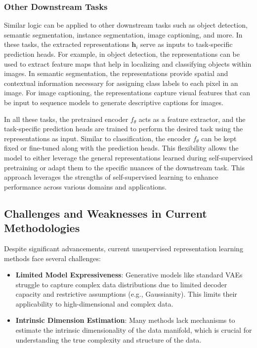 \begin{itemize}
\subsubsection{Other Downstream Tasks}

Similar logic can be applied to other downstream tasks such as object detection, semantic segmentation, instance segmentation, image captioning, and more. In these tasks, the extracted representations \( \mathbf{h}_i \) serve as inputs to task-specific prediction heads. For example, in object detection, the representations can be used to extract feature maps that help in localizing and classifying objects within images. In semantic segmentation, the representations provide spatial and contextual information necessary for assigning class labels to each pixel in an image. For image captioning, the representations capture visual features that can be input to sequence models to generate descriptive captions for images.

In all these tasks, the pretrained encoder \( f_{\theta} \) acts as a feature extractor, and the task-specific prediction heads are trained to perform the desired task using the representations as input. Similar to classification, the encoder \( f_{\theta} \) can be kept fixed or fine-tuned along with the prediction heads. This flexibility allows the model to either leverage the general representations learned during self-supervised pretraining or adapt them to the specific nuances of the downstream task. This approach leverages the strengths of self-supervised learning to enhance performance across various domains and applications.


\subsection{Challenges and Weaknesses in Current Methodologies}

Despite significant advancements, current unsupervised representation learning methods face several challenges:

\begin{itemize}
    \item \textbf{Limited Model Expressiveness}: Generative models like standard VAEs struggle to capture complex data distributions due to limited decoder capacity and restrictive assumptions (e.g., Gaussianity). This limits their applicability to high-dimensional and complex data.

    \item \textbf{Intrinsic Dimension Estimation}: Many methods lack mechanisms to estimate the intrinsic dimensionality of the data manifold, which is crucial for understanding the true complexity and structure of the data.


\end{itemize}
\end{itemize}
